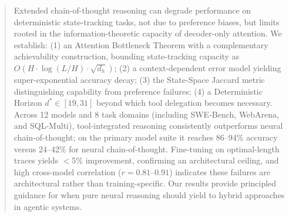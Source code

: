 \documentclass{article}
\theoremstyle{plain}
\theoremstyle{definition}
\theoremstyle{remark}
\begin{document}

\printAffiliationsAndNotice{}


\begin{abstract}
	Extended chain-of-thought reasoning can degrade performance on deterministic state-tracking tasks, not due to preference biases, but limits rooted in the information-theoretic capacity of decoder-only attention. We establish: (1) an Attention Bottleneck Theorem with a complementary achievability construction, bounding state-tracking capacity as $O(H \cdot \log(L/H) \cdot \sqrt{d_h})$; (2) a context-dependent error model yielding super-exponential accuracy decay; (3) the State-Space Jaccard metric distinguishing capability from preference failures; (4) a Deterministic Horizon $d^* \in [19, 31]$ beyond which tool delegation becomes necessary. Across 12 models and 8 task domains (including SWE-Bench, WebArena, and SQL-Multi), tool-integrated reasoning consistently outperforms neural chain-of-thought; on the primary model suite it reaches 86--94\% accuracy versus 24--42\% for neural chain-of-thought. Fine-tuning on optimal-length traces yields $<$5\% improvement, confirming an architectural ceiling, and high cross-model correlation ($r = 0.81$--$0.91$) indicates these failures are architectural rather than training-specific. Our results provide principled guidance for when pure neural reasoning should yield to hybrid approaches in agentic systems.
\end{abstract}
\end{document}
